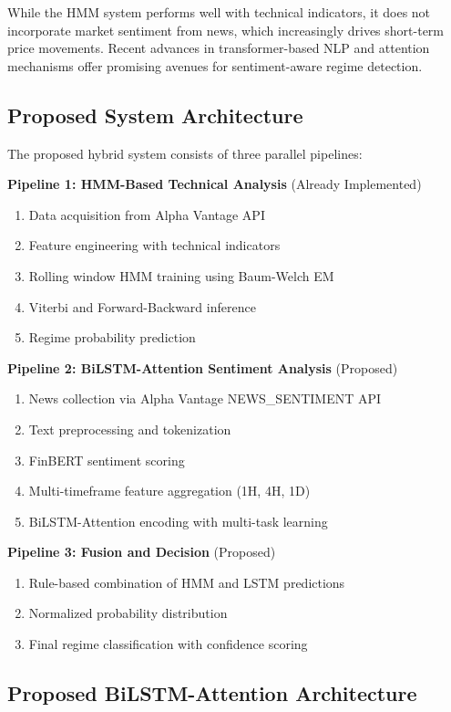 \documentclass[conference]{IEEEtran}
\begin{document}
While the HMM system performs well with technical indicators, it does not incorporate market sentiment from news, which increasingly drives short-term price movements. Recent advances in transformer-based NLP and attention mechanisms offer promising avenues for sentiment-aware regime detection.

\subsection{Proposed System Architecture}

The proposed hybrid system consists of three parallel pipelines:

\textbf{Pipeline 1: HMM-Based Technical Analysis} (Already Implemented)
\begin{enumerate}
\item Data acquisition from Alpha Vantage API
\item Feature engineering with technical indicators
\item Rolling window HMM training using Baum-Welch EM
\item Viterbi and Forward-Backward inference
\item Regime probability prediction
\end{enumerate}

\textbf{Pipeline 2: BiLSTM-Attention Sentiment Analysis} (Proposed)
\begin{enumerate}
\item News collection via Alpha Vantage NEWS\_SENTIMENT API
\item Text preprocessing and tokenization
\item FinBERT sentiment scoring
\item Multi-timeframe feature aggregation (1H, 4H, 1D)
\item BiLSTM-Attention encoding with multi-task learning
\end{enumerate}

\textbf{Pipeline 3: Fusion and Decision} (Proposed)
\begin{enumerate}
\item Rule-based combination of HMM and LSTM predictions
\item Normalized probability distribution
\item Final regime classification with confidence scoring
\end{enumerate}

\subsection{Proposed BiLSTM-Attention Architecture}
\end{document}
